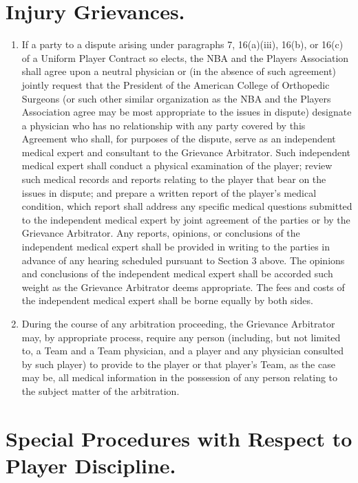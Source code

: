 \documentclass[
]{book}
\providecommand{\tightlist}{%
  \setlength{\itemsep}{0pt}\setlength{\parskip}{0pt}}
\begin{document}
\hypertarget{injury-grievances.}{%
\section{Injury Grievances.}\label{injury-grievances.}}

\begin{enumerate}
\def\labelenumi{(\alph{enumi})}
\tightlist
\item
  If a party to a dispute arising under paragraphs 7, 16(a)(iii), 16(b), or 16(c) of a Uniform Player Contract so elects, the NBA and the Players Association shall agree upon a neutral physician or (in the absence of such agreement) jointly request that the President of the American College of Orthopedic Surgeons (or such other similar organization as the NBA and the Players Association agree may be most appropriate to the issues in dispute) designate a physician who has no relationship with any party covered by this Agreement who shall, for purposes of the dispute, serve as an independent medical expert and consultant to the Grievance Arbitrator. Such independent medical expert shall conduct a physical examination of the player; review such medical records and reports relating to the player that bear on the issues in dispute; and prepare a written report of the player's medical condition, which report shall address any specific medical questions submitted to the independent medical expert by joint agreement of the parties or by the Grievance Arbitrator. Any reports, opinions, or conclusions of the independent medical expert shall be provided in writing to the parties in advance of any hearing scheduled pursuant to Section 3 above. The opinions and conclusions of the independent medical expert shall be accorded such weight as the Grievance Arbitrator deems appropriate. The fees and costs of the independent medical expert shall be borne equally by both sides.
\item
  During the course of any arbitration proceeding, the Grievance Arbitrator may, by appropriate process, require any person (including, but not limited to, a Team and a Team physician, and a player and any physician consulted by such player) to provide to the player or that player's Team, as the case may be, all medical information in the possession of any person relating to the subject matter of the arbitration.
\end{enumerate}

\hypertarget{special-procedures-with-respect-to-player-discipline.}{%
\section{Special Procedures with Respect to Player Discipline.}\label{special-procedures-with-respect-to-player-discipline.}}
\end{document}
